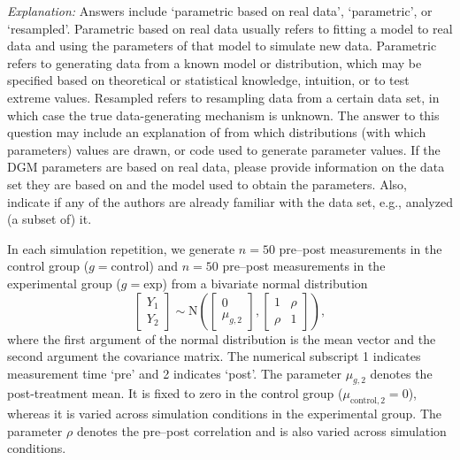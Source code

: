\documentclass[12pt]{article}
\begin{document}
\textit{Explanation:} Answers include `parametric based on real data', `parametric', or `resampled'. Parametric based on real data usually refers to fitting a model to real data and using the parameters of that model to simulate new data. Parametric refers to generating data from a known model or distribution, which may be specified based on theoretical or statistical knowledge, intuition, or to test extreme values. Resampled refers to resampling data from a certain data set, in which case the true data-generating mechanism is unknown. The answer to this question may include an explanation of from which distributions (with which parameters) values are drawn, or code used to generate parameter values. If the DGM parameters are based on real data, please provide information on the data set they are based on and the model used to obtain the parameters. Also, indicate if any of the authors are already familiar with the data set, e.g., analyzed (a subset of) it.

\begin{examplebox}
In each simulation repetition, we generate $n=50$ pre--post measurements in the control group ($g = \text{control}$) and $n = 50$ pre--post measurements in the experimental group ($g = \text{exp}$) from a bivariate normal distribution
\begin{equation}
    \label{eq:bivariateNormal}
    \left[\begin{array}{c}Y_1 \\ Y_2 \end{array}\right] \sim\text{N}\left(\left[\begin{array}{c}0 \\ \mu_{g,2} \end{array}\right],\left[\begin{array}{cc} 1 & \rho  \\ \rho & 1 \end{array}\right]\right),
\end{equation}
where the first argument of the normal distribution is the mean vector and the second argument the covariance matrix.
The numerical subscript 1 indicates measurement time `pre' and 2 indicates `post'. The parameter $\mu_{g,2}$ denotes the post-treatment mean. It is fixed to zero in the control group (${\mu_{\text{control},2}} = 0$), whereas it is varied across simulation conditions in the experimental group. The parameter $\rho$ denotes the pre--post correlation and is also varied across simulation conditions.
\end{examplebox}
\end{document}
